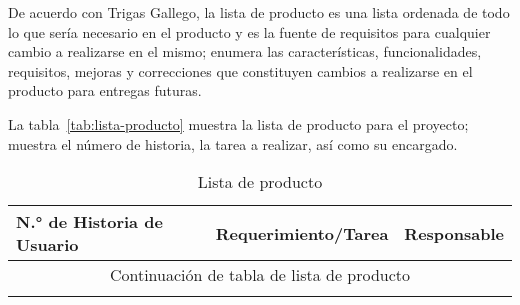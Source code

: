 De acuerdo con Trigas Gallego\cite{manuel_trigas_gallego_metodologiscrum_2020}, la lista de producto es una lista ordenada de todo lo que sería necesario en el producto y es la fuente de requisitos para cualquier cambio a realizarse en el mismo; enumera las características, funcionalidades, requisitos, mejoras y correcciones que constituyen cambios a realizarse en el producto para entregas futuras.

La tabla~\ref{tab:lista-producto} muestra la lista de producto para el proyecto; muestra el número de historia, la tarea a realizar, así como su encargado.


\begin{longtable}{ p{2cm} | p{10cm} | p{2cm} }
	\hline
	N.° de Historia de Usuario & Requerimiento/Tarea & Responsable \\[0.5cm]
	\hline
	\hline

	\endfirsthead

	\multicolumn{3}{c}{Continuación de tabla de lista de producto }\\
	\hline
	\hline
	\endhead

	\hline
	\hline
	\caption{Lista de producto}
	\endlastfoot



\end{longtable}
